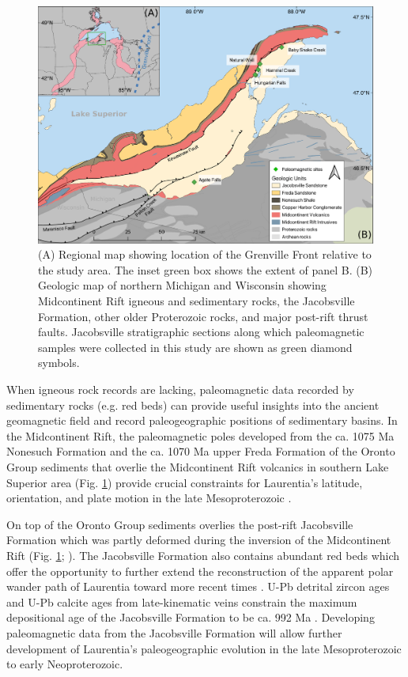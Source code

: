 \documentclass[draft]{agujournal2019}
\begin{document}
\begin{figure}[h!]
\centering
\includegraphics[width=\textwidth]{Geologic_map.pdf}
\caption{(A) Regional map showing location of the Grenville Front relative to the study area. The inset green box shows the extent of panel B. (B) Geologic map of northern Michigan and Wisconsin showing Midcontinent Rift igneous and sedimentary rocks, the Jacobsville Formation, other older Proterozoic rocks, and major post-rift thrust faults. Jacobsville stratigraphic sections along which paleomagnetic samples were collected in this study are shown as green diamond symbols.}
\label{fig:Geologic_map}
\end{figure}

When igneous rock records are lacking, paleomagnetic data recorded by sedimentary rocks (e.g. red beds) can provide useful insights into the ancient geomagnetic field and record paleogeographic positions of sedimentary basins. In the Midcontinent Rift, the paleomagnetic poles developed from the ca. 1075 Ma Nonesuch Formation and the ca. 1070 Ma upper Freda Formation of the Oronto Group sediments that overlie the Midcontinent Rift volcanics in southern Lake Superior area (Fig. \ref{fig:Geologic_map}) provide crucial constraints for Laurentia's latitude, orientation, and plate motion in the late Mesoproterozoic \cite{Henry1977a, Swanson-Hysell2019a, Swanson-Hysell2019b}. 

On top of the Oronto Group sediments overlies the post-rift Jacobsville Formation which was partly deformed during the inversion of the Midcontinent Rift (Fig. \ref{fig:Geologic_map}; ). The Jacobsville Formation also contains abundant red beds which offer the opportunity to further extend the reconstruction of the apparent polar wander path of Laurentia toward more recent times \cite{Hamblin1958a, Roy1978a}. U-Pb detrital zircon ages and U-Pb calcite ages from late-kinematic veins constrain the maximum depositional age of the Jacobsville Formation to be ca. 992 Ma \cite{Hodgin2022a}. Developing paleomagnetic data from the Jacobsville Formation will allow further development of Laurentia's paleogeographic evolution in the late Mesoproterozoic to early Neoproterozoic. 
\end{document}
